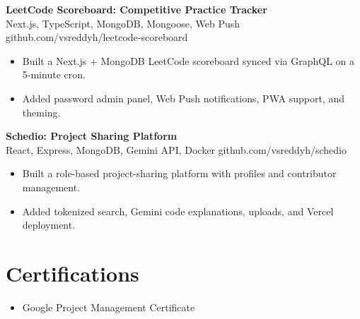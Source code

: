 \documentclass[a4paper,11pt]{article}
\newcommand{\resumeItem}[1]{\item \small{#1}}
\newcommand{\resumeSubheading}[4]{%
  \textbf{#1} \hfill \textbf{#2} \\
{#3} \hfill {#4}
}
\newcommand{\resumeSubHeadingListStart}{\begin{itemize}}
\newcommand{\resumeSubHeadingListEnd}{\end{itemize}}
\begin{document}
\resumeSubheading
{LeetCode Scoreboard: Competitive Practice Tracker}{}{Next.js, TypeScript, MongoDB, Mongoose, Web Push}{github.com/vsreddyh/leetcode-scoreboard}
\resumeSubHeadingListStart
\resumeItem{Built a Next.js + MongoDB LeetCode scoreboard synced via GraphQL on a 5-minute cron.}
\resumeItem{Added password admin panel, Web Push notifications, PWA support, and theming.}
\resumeSubHeadingListEnd

\resumeSubheading
{Schedio: Project Sharing Platform}{}{React, Express, MongoDB, Gemini API, Docker}{github.com/vsreddyh/schedio}
\resumeSubHeadingListStart
\resumeItem{Built a role-based project-sharing platform with profiles and contributor management.}
\resumeItem{Added tokenized search, Gemini code explanations, uploads, and Vercel deployment.}
\resumeSubHeadingListEnd


\vspace{-0.6em}




\section*{Certifications}
\begin{itemize}
\resumeItem{Google Project Management Certificate}
\end{itemize}
\end{document}
